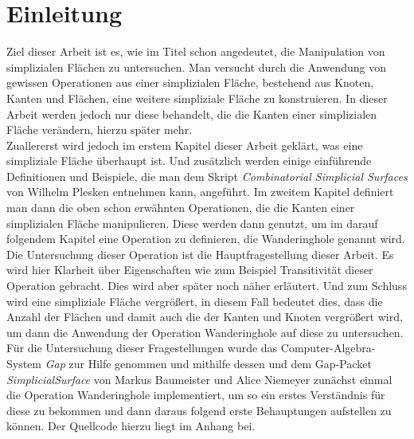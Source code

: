 \documentclass[12pt,titlepage]{article}
\begin{document}
\section{Einleitung}
Ziel dieser Arbeit ist es, wie im Titel schon angedeutet, die Manipulation von simplizialen Flächen zu untersuchen. Man versucht durch die Anwendung von gewissen Operationen aus einer simplizialen Fläche, bestehend aus Knoten, Kanten und Flächen, eine weitere simpliziale Fläche zu konstruieren. In dieser Arbeit werden jedoch nur diese behandelt, die die Kanten einer simplizialen Fläche verändern, hierzu später mehr.\\
Zuallererst wird jedoch im erstem Kapitel dieser Arbeit geklärt, was eine simpliziale Fläche überhaupt ist. Und zusätzlich werden einige einführende Definitionen und Beispiele, die man dem Skript \emph{Combinatorial Simplicial Surfaces} von Wilhelm Plesken entnehmen kann, angeführt. Im zweitem Kapitel definiert man dann die oben schon erwähnten Operationen, die die Kanten einer simplizialen Fläche manipulieren. Diese werden dann genutzt, um im darauf folgendem Kapitel eine Operation zu definieren, die Wanderinghole genannt wird. Die Untersuchung dieser Operation ist die Hauptfragestellung dieser Arbeit. Es wird hier Klarheit über Eigenschaften wie zum Beispiel Transitivität dieser Operation gebracht. Dies wird aber später noch näher erläutert. Und zum Schluss wird eine simpliziale Fläche vergrößert, in diesem Fall bedeutet dies, dass die Anzahl der Flächen und damit auch die der Kanten und Knoten vergrößert wird, um dann die Anwendung der Operation Wanderinghole auf diese zu untersuchen. \\
Für die Untersuchung dieser Fragestellungen wurde das Computer-Algebra-System \emph{Gap} zur Hilfe genommen und mithilfe dessen und dem Gap-Packet \emph{SimplicialSurface} von Markus Baumeister und Alice Niemeyer zunächst einmal die Operation Wanderinghole implementiert, um so ein erstes Verständnis für diese zu bekommen und dann daraus folgend erste Behauptungen aufstellen zu können. Der Quellcode hierzu liegt im Anhang bei. 
\newpage
\end{document}
